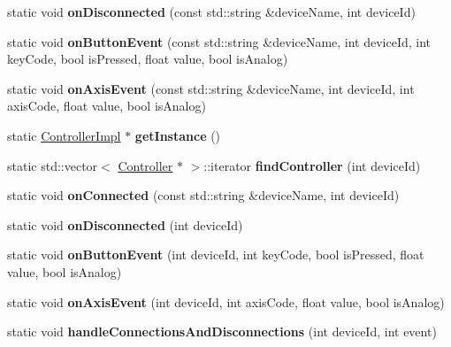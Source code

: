 \begin{DoxyCompactItemize}
static void {\bfseries on\+Disconnected} (const std\+::string \&device\+Name, int device\+Id)
\item 
\mbox{\label{classControllerImpl_ad73868f51506f68926dbe2ea48632697}} 
static void {\bfseries on\+Button\+Event} (const std\+::string \&device\+Name, int device\+Id, int key\+Code, bool is\+Pressed, float value, bool is\+Analog)
\item 
\mbox{\label{classControllerImpl_a7f27d02ca99950a38b88666abaf16077}} 
static void {\bfseries on\+Axis\+Event} (const std\+::string \&device\+Name, int device\+Id, int axis\+Code, float value, bool is\+Analog)
\item 
\mbox{\label{classControllerImpl_a02e756ae5aac1b33e8ab9bd1aa46d334}} 
static \hyperlink{classControllerImpl}{Controller\+Impl} $\ast$ {\bfseries get\+Instance} ()
\item 
\mbox{\label{classControllerImpl_a51dac87730cfd99dfd7e13583d727958}} 
static std\+::vector$<$ \hyperlink{classController}{Controller} $\ast$ $>$\+::iterator {\bfseries find\+Controller} (int device\+Id)
\item 
\mbox{\label{classControllerImpl_a0e5e630ca14e4284f1d4f7360985e18c}} 
static void {\bfseries on\+Connected} (const std\+::string \&device\+Name, int device\+Id)
\item 
\mbox{\label{classControllerImpl_a70af5bc346873fc5a3a0d7df98ee7fd6}} 
static void {\bfseries on\+Disconnected} (int device\+Id)
\item 
\mbox{\label{classControllerImpl_ae199b179d11b458ed68d1040e97b5073}} 
static void {\bfseries on\+Button\+Event} (int device\+Id, int key\+Code, bool is\+Pressed, float value, bool is\+Analog)
\item 
\mbox{\label{classControllerImpl_a51588795549b52118c1fadbfbb7240e5}} 
static void {\bfseries on\+Axis\+Event} (int device\+Id, int axis\+Code, float value, bool is\+Analog)
\item 
\mbox{\label{classControllerImpl_abfef2778a01570c8588331996c7bb9a6}} 
static void {\bfseries handle\+Connections\+And\+Disconnections} (int device\+Id, int event)
\end{DoxyCompactItemize}
